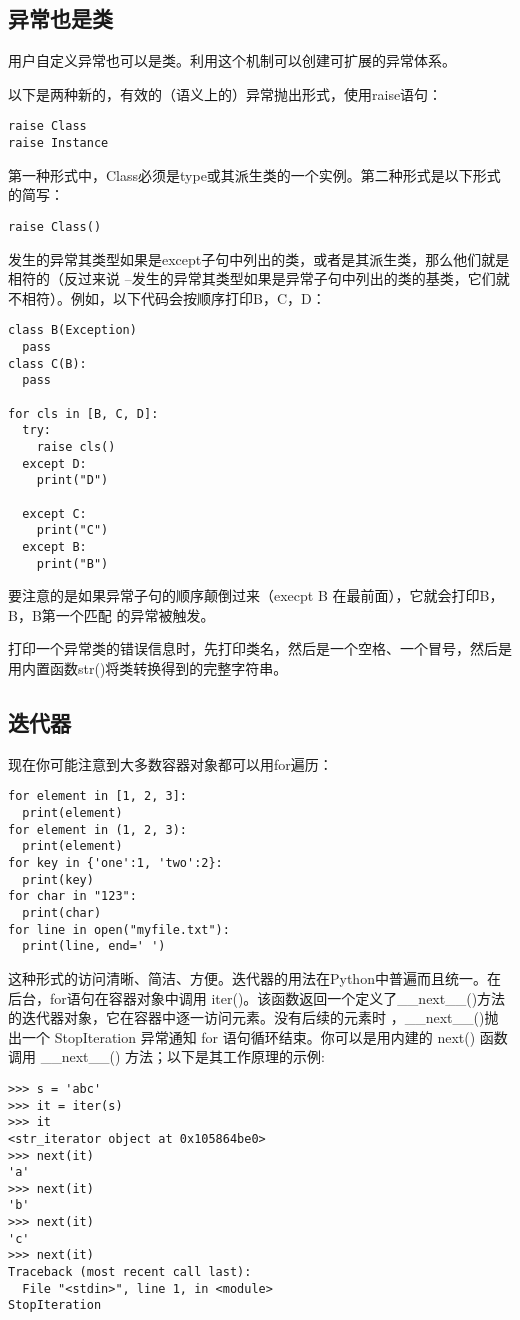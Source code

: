 \documentclass[UTF8]{ctexart}
\begin{document}
\subsection{异常也是类}
用户自定义异常也可以是类。利用这个机制可以创建可扩展的异常体系。

以下是两种新的，有效的（语义上的）异常抛出形式，使用raise语句：
\begin{verbatim}
raise Class
raise Instance
\end{verbatim}

第一种形式中，Class必须是type或其派生类的一个实例。第二种形式是以下形式的简写：
\begin{verbatim}
raise Class()
\end{verbatim}

发生的异常其类型如果是except子句中列出的类，或者是其派生类，那么他们就是相符的（反过来说
--发生的异常其类型如果是异常子句中列出的类的基类，它们就不相符）。例如，以下代码会按顺序打印B，C，D：
\begin{verbatim}
class B(Exception)
  pass
class C(B):
  pass

for cls in [B, C, D]:
  try:
    raise cls()
  except D:
    print("D")

  except C:
    print("C")
  except B:
    print("B")
\end{verbatim}

要注意的是如果异常子句的顺序颠倒过来（execpt B 在最前面），它就会打印B，B，B\-\-第一个匹配
的异常被触发。

打印一个异常类的错误信息时，先打印类名，然后是一个空格、一个冒号，然后是用内置函数str()将类转换得到的完整字符串。

\subsection{迭代器}
现在你可能注意到大多数容器对象都可以用for遍历：
\begin{verbatim}
for element in [1, 2, 3]:
  print(element)
for element in (1, 2, 3):
  print(element)
for key in {'one':1, 'two':2}:
  print(key)
for char in "123":
  print(char)
for line in open("myfile.txt"):
  print(line, end=' ')
\end{verbatim}

这种形式的访问清晰、简洁、方便。迭代器的用法在Python中普遍而且统一。在后台，for语句在容器对象中调用
iter()。该函数返回一个定义了\_\_next\_\_()方法的迭代器对象，它在容器中逐一访问元素。没有后续的元素时
，\_\_next\_\_()抛出一个 StopIteration 异常通知 for 语句循环结束。你可以是用内建的 next()
函数调用 \_\_next\_\_() 方法；以下是其工作原理的示例:
\begin{verbatim}
>>> s = 'abc'
>>> it = iter(s)
>>> it
<str_iterator object at 0x105864be0>
>>> next(it)
'a'
>>> next(it)
'b'
>>> next(it)
'c'
>>> next(it)
Traceback (most recent call last):
  File "<stdin>", line 1, in <module>
StopIteration
\end{verbatim}
\end{document}

